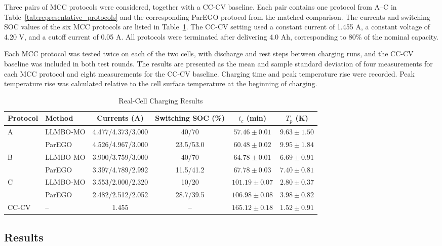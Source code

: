 \documentclass[journal,10pt]{IEEEtran}
\begin{document}
Three pairs of MCC protocols were considered, together with
a CC-CV baseline. Each pair contains one protocol from A--C
in Table~\ref{tab:representative_protocols} and the
corresponding ParEGO protocol from the matched comparison.
The currents and switching SOC values of the six MCC
protocols are listed in Table~\ref{tab:realcell_results}.
The CC-CV setting used a constant current of 1.455 A, a
constant voltage of 4.20 V, and a cutoff current of
0.05 A. All protocols were terminated after delivering
4.0 Ah, corresponding to 80\% of the nominal capacity.

Each MCC protocol was tested twice on each of the two cells,
with discharge and rest steps between charging runs, and the
CC-CV baseline was included in both test rounds. The results
are presented as the mean and sample standard deviation of
four measurements for each MCC protocol and eight
measurements for the CC-CV baseline. Charging time and peak
temperature rise were recorded. Peak temperature rise was
calculated relative to the cell surface temperature at the
beginning of charging.

\begin{table}[!t]
\caption{Real-Cell Charging Results}
\label{tab:realcell_results}
\centering
\scriptsize
\setlength{\tabcolsep}{2.0pt}
\begin{tabular}{@{}llcccc@{}}
\toprule
Protocol & Method & Currents (A) & Switching SOC (\%) & $t_c$ (min) & $T_p$ (K) \\
\midrule
A & LLMBO-MO & 4.477/4.373/3.000 & 40/70 & $\mathbf{57.46\pm0.01}$ & $\mathbf{9.63\pm1.50}$ \\
 & ParEGO & 4.526/4.967/3.000 & 23.5/53.0 & $60.48\pm0.02$ & $9.95\pm1.84$ \\
B & LLMBO-MO & 3.900/3.759/3.000 & 40/70 & $\mathbf{64.78\pm0.01}$ & $\mathbf{6.69\pm0.91}$ \\
 & ParEGO & 3.397/4.789/2.992 & 11.5/41.2 & $67.78\pm0.03$ & $7.40\pm0.81$ \\
C & LLMBO-MO & 3.553/2.000/2.320 & 10/20 & $\mathbf{101.19\pm0.07}$ & $\mathbf{2.80\pm0.37}$ \\
 & ParEGO & 2.482/2.512/2.052 & 28.7/39.5 & $106.98\pm0.08$ & $3.98\pm0.82$ \\
CC-CV & -- & 1.455 & -- & $165.12\pm0.18$ & $1.52\pm0.91$ \\
\bottomrule
\end{tabular}
\end{table}

\subsection{Results}
\end{document}
